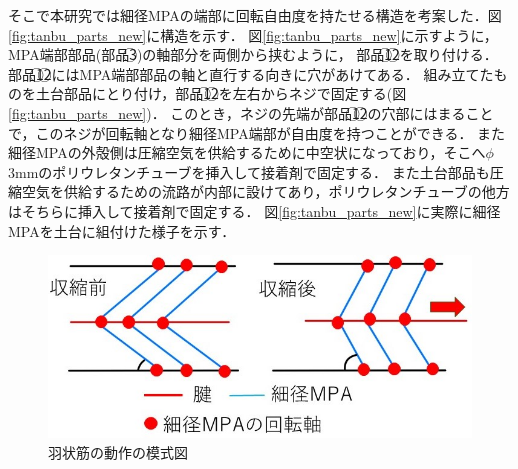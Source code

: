 そこで本研究では細径MPAの端部に回転自由度を持たせる構造を考案した．図\ref{fig:tanbu_parts_new}に構造を示す．
図\ref{fig:tanbu_parts_new}に示すように，MPA端部部品(部品\textcircled{\scriptsize 3})の軸部分を両側から挟むように，
部品\textcircled{\scriptsize 1}\textcircled{\scriptsize 2}を取り付ける．
部品\textcircled{\scriptsize 1}\textcircled{\scriptsize 2}にはMPA端部部品の軸と直行する向きに穴があけてある．
組み立てたものを土台部品にとり付け，部品\textcircled{\scriptsize 1}\textcircled{\scriptsize 2}を左右からネジで固定する(図\ref{fig:tanbu_parts_new})．
このとき，ネジの先端が部品\textcircled{\scriptsize 1}\textcircled{\scriptsize 2}の穴部にはまることで，このネジが回転軸となり細径MPA端部が自由度を持つことができる．
また細径MPAの外殻側は圧縮空気を供給するために中空状になっており，そこへ$\phi$ 3mmのポリウレタンチューブを挿入して接着剤で固定する．
また土台部品も圧縮空気を供給するための流路が内部に設けてあり，ポリウレタンチューブの他方はそちらに挿入して接着剤で固定する．
図\ref{fig:tanbu_parts_new}に実際に細径MPAを土台に組付けた様子を示す．
%
\begin{figure}[htbp]
  \centering
  \includegraphics[scale=0.5]{image/ujyoukin.jpg}
  \caption{羽状筋の動作の模式図}
  \label{fig:ujyoukin_moshiki}
\end{figure}
%
